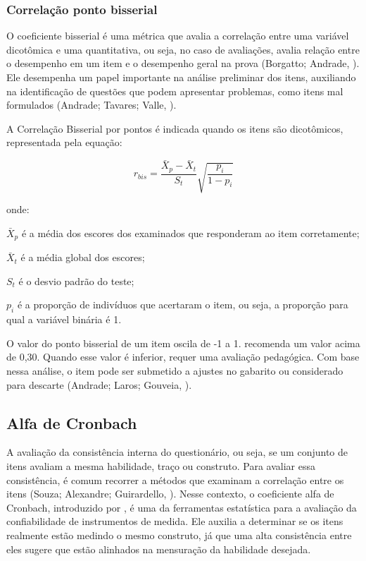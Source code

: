 \subsubsection{Correlação ponto bisserial}

O coeficiente bisserial é uma métrica que avalia a correlação entre uma variável dicotômica e uma quantitativa, ou seja, no caso de avaliações, avalia relação entre o desempenho em um item e o desempenho geral na prova (Borgatto; Andrade, \citeyear{BORGATTO2012}). Ele desempenha um papel importante na análise preliminar dos itens, auxiliando na identificação de questões que podem apresentar problemas, como itens mal formulados (Andrade; Tavares; Valle, \citeyear{de2000teoria}).

A Correlação Bisserial por pontos é indicada quando os itens são dicotômicos, representada pela equação:


\begin{equation}
	r_{bis} = \frac{\bar{X}_p - \bar{X}_t}{S_t}
	\sqrt{\frac{p_i}{1 - p_i}}
\end{equation}

onde:


\noindent $ \bar{X}_p $ é a média dos escores dos examinados que responderam ao item corretamente;

\noindent $ \bar{X}_t $ é a média global dos escores;

\noindent $ S_t $ é o desvio padrão do teste;

\noindent $ p_i $  é a proporção de indivíduos que acertaram o item, ou seja, a proporção para qual a variável binária é 1.


O valor do ponto bisserial de um item oscila de -1 a 1. \cite{pasquali2003} recomenda um valor acima de 0,30. Quando esse valor é inferior, requer uma avaliação pedagógica. Com base nessa análise, o item pode ser submetido a ajustes no gabarito ou considerado para descarte (Andrade; Laros; Gouveia, \citeyear{andrade2010uso}).


\subsection{Alfa de Cronbach}

A avaliação da consistência interna do questionário, ou seja, se um conjunto de itens avaliam a mesma habilidade, traço ou construto. Para avaliar essa consistência, é comum recorrer a métodos que examinam a correlação entre os itens (Souza; Alexandre; Guirardello, \citeyear{souza2017}). Nesse contexto, o coeficiente alfa de Cronbach, introduzido por  ,  é uma da ferramentas estatística para a avaliação da confiabilidade de instrumentos de medida. Ele auxilia  a determinar se os itens realmente estão medindo o mesmo construto, já que uma alta consistência entre eles sugere que estão alinhados na mensuração da habilidade desejada.

